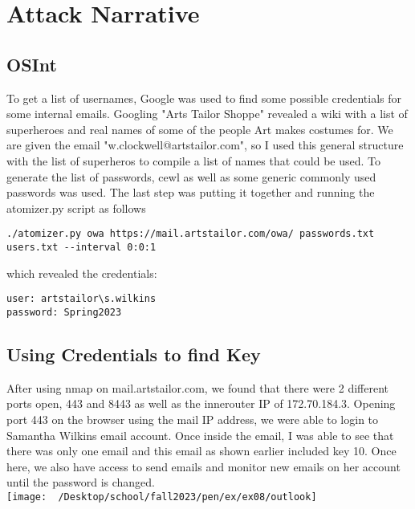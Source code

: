 \documentclass[notitlepage]{article}
\begin{document}
\section{Attack Narrative}
    
    \subsection{OSInt}
    To get a list of usernames, Google was used to find some possible credentials for some internal emails. Googling "Arts Tailor Shoppe" revealed a wiki with a
    list of superheroes and real names of some of the people Art makes costumes for. We are given the email "w.clockwell@artstailor.com", so I used this general structure
    with the list of superheros to compile a list of names that could be used. To generate the list of passwords, cewl as well as some generic commonly used passwords was used.
    The last step was putting it together and running the atomizer.py script as follows
    \begin{verbatim}
./atomizer.py owa https://mail.artstailor.com/owa/ passwords.txt users.txt --interval 0:0:1
    \end{verbatim}
    which revealed the credentials:
    \begin{verbatim}
user: artstailor\s.wilkins
password: Spring2023
    \end{verbatim}

    \subsection{Using Credentials to find Key}
    After using nmap on mail.artstailor.com, we found that there were 2 different ports open, 443 and 8443 as well as the innerouter IP of 172.70.184.3. Opening port 443 on the browser using the mail IP address, we were able to login
    to Samantha Wilkins email account. Once inside the email, I was able to see that there was only one email and this email as shown earlier included key 10. Once here, we also have access to send 
    emails and monitor new emails on her account until the password is changed.  \\
\texttt{[image: ~/Desktop/school/fall2023/pen/ex/ex08/outlook]}
\end{document}
